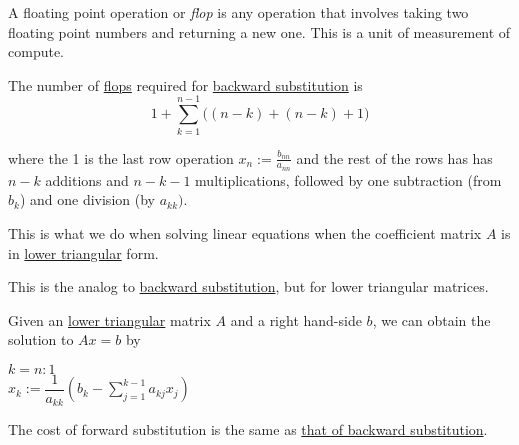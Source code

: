 \label{e6258dc}

A floating point operation or \textit{flop} is any operation that involves
taking two floating point numbers and returning a new one. This is a unit of
measurement of compute.

\label{b6da5de}

The number of \href{e6258dc}{flops} required for \href{fe9f7f5}{backward
substitution} is
$$
  1+\sum_{k=1}^{n-1}\bigl((n-k)+(n-k)+1\bigr)
$$

where the 1 is the last row operation $x_n:=\frac{b_{nn}}{a_{nn}}$ and the rest
of the rows has has $n-k$ additions and $n-k-1$ multiplications, followed by
one subtraction (from $b_k$) and one division (by $a_{kk})$.

\label{a181277}

This is what we do when solving linear equations when the coefficient matrix
$A$ is in \href{ce94591}{lower triangular} form.

This is the analog to \href{a0fa0a9}{backward substitution}, but for lower
triangular matrices.

\label{aa9af77}

Given an \href{ce94591}{lower triangular} matrix $A$ and a right hand-side $b$,
we can obtain the solution to $Ax=b$ by

\begin{pseudocode}
  \For $k=n:1$ \\
  \tab $x_k:=\dfrac1{a_{kk}}\left(b_k-\sum_{j=1}^{k-1}a_{kj}x_j\right)$ \\
  \End
\end{pseudocode}

\label{eab27ba}

The cost of forward substitution is the same as \href{b6da5de}{that of backward
substitution}.

